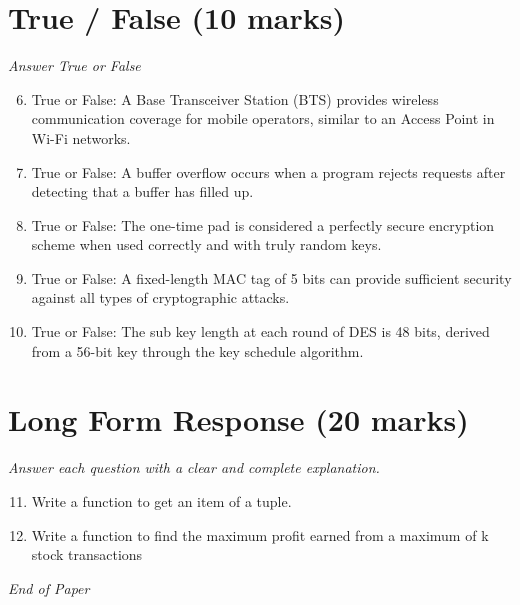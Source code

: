 \documentclass[12pt]{article}
\begin{document}
\section*{True / False (10 marks)}
\textit{Answer True or False}
\begin{enumerate}[label=\arabic*.]
\setcounter{enumi}{5}
\item True or False: A Base Transceiver Station (BTS) provides wireless communication coverage for mobile operators, similar to an Access Point in Wi-Fi networks.
\item True or False: A buffer overflow occurs when a program rejects requests after detecting that a buffer has filled up.
\item True or False: The one-time pad is considered a perfectly secure encryption scheme when used correctly and with truly random keys.
\item True or False: A fixed-length MAC tag of 5 bits can provide sufficient security against all types of cryptographic attacks.
\item True or False: The sub key length at each round of DES is 48 bits, derived from a 56-bit key through the key schedule algorithm.
\end{enumerate}

\section*{Long Form Response (20 marks)}
\textit{Answer each question with a clear and complete explanation.}
\begin{enumerate}[label=\arabic*.]
\setcounter{enumi}{10}
\item Write a function to get an item of a tuple.
\item Write a function to find the maximum profit earned from a maximum of k stock transactions
\end{enumerate}

\vfill
\noindent\textit{End of Paper}
\end{document}
